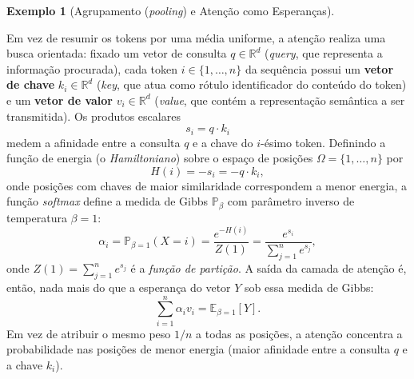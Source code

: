 \documentclass[12pt,portuguese]{article}
\theoremstyle{definition}
\newtheorem{example}[example]{Exemplo}
\begin{document}
\begin{example}[Agrupamento (\emph{pooling}) e Atenção como Esperanças]
\begin{enumerate}
Em vez de resumir os tokens por uma média uniforme, a atenção realiza uma busca
orientada: fixado um vetor de consulta $q\in\mathbb{R}^d$ (\emph{query}, que
representa a informação procurada), cada token $i\in\{1,\ldots,n\}$ da sequência
possui um \textbf{vetor de chave} $k_i\in\mathbb{R}^d$ (\emph{key}, que atua
como rótulo identificador do conteúdo do token) e um \textbf{vetor de valor}
$v_i\in\mathbb{R}^d$ (\emph{value}, que contém a representação semântica a ser
transmitida). Os produtos escalares
\[
s_i=q\cdot k_i
\]
medem a afinidade entre a consulta $q$ e a chave do $i$-ésimo token. Definindo a
função de energia (o \emph{Hamiltoniano}) sobre o espaço de posições $\Omega=\{1,\ldots,n\}$ por
\[
H(i) = -s_i = -q\cdot k_i,
\]
onde posições com chaves de maior similaridade correspondem a menor energia, a função
\emph{softmax} define a medida de Gibbs $\mathbb{P}_\beta$ com parâmetro
inverso de temperatura $\beta=1$:
\[
\alpha_i
=
\mathbb{P}_{\beta=1}(X=i)
=
\frac{e^{-H(i)}}{Z(1)}
=
\frac{e^{s_i}}{\sum_{j=1}^{n}e^{s_j}},
\]
onde $Z(1)=\sum_{j=1}^n e^{s_j}$ é a \emph{função de partição}. A saída da
camada de atenção é, então, nada mais do que a esperança do vetor $Y$ sob essa
medida de Gibbs:
\[
\sum_{i=1}^{n}\alpha_i v_i = \mathbb{E}_{\beta=1}[Y].
\]
Em vez de atribuir o mesmo peso $1/n$ a todas as posições, a atenção concentra
a probabilidade nas posições de menor energia (maior afinidade entre a consulta
$q$ e a chave $k_i$).
\end{enumerate}

\begin{figure}[H]
\centering
{}
\end{figure}
\end{example}
\end{document}
